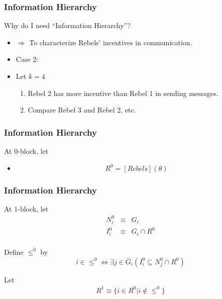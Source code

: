 \documentclass[10pt]{beamer}
\begin{document}
\begin{frame}
   \frametitle{Information Hierarchy}


Why do I need ``Information Hierarchy''?
\begin{itemize}
\item $\Rightarrow$ To characterize Rebels' incentives in communication.
\item Case 2: \item Let $k=4$
 \begin{center}
\end{center}

\begin{enumerate}
\item Rebel 2 has more incentive than Rebel 1 in sending messages.
\item Compare Rebel 3 and Rebel 2, etc.
\end{enumerate}

\end{itemize}



\end{frame}











\begin{frame}
  \frametitle{Information Hierarchy}

At $0$-block, let
  \begin{itemize}
  \item \[R^0=[Rebels](\theta)\]
  \end{itemize}


\end{frame}



\begin{frame}
  \frametitle{Information Hierarchy}

At $1$-block, let
\begin{eqnarray*}
N^0_i & \equiv &  G_i\\
I^0_i & \equiv & G_i\cap R^0\\
\end{eqnarray*}

Define $\leq^0$ by
\[i\in \leq^0 \Leftrightarrow \exists  j\in \bar{G}_i (I^0_i\subseteq N^0_j\cap R^0)\] 


Let 
\begin{eqnarray*}
R^{1} \equiv \{i\in R^0|i\notin \leq^0\}
\end{eqnarray*}




\end{frame}
\end{document}
